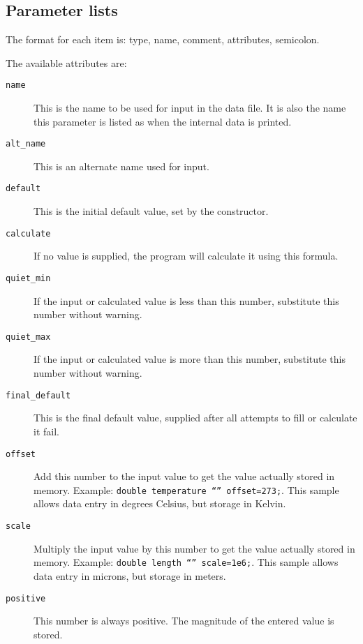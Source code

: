 \subsection{Parameter lists}

The format for each item is: type, name, comment, attributes, semicolon.

The available attributes are:

\begin{description}

\item[{\tt name}]
This is the name to be used for input in the data file.  It is also
the name this parameter is listed as when the internal data is
printed.

\item[{\tt alt\_name}]
This is an alternate name used for input.

\item[{\tt default}]
This is the initial default value, set by the constructor.

\item[{\tt calculate}]
If no value is supplied, the program will calculate it using this
formula.

\item[{\tt quiet\_min}]
If the input or calculated value is less than this number, substitute
this number without warning.

\item[{\tt quiet\_max}]
If the input or calculated value is more than this number, substitute
this number without warning.

\item[{\tt final\_default}]
This is the final default value, supplied after all attempts to fill
or calculate it fail.

\item[{\tt offset}]
Add this number to the input value to get the value actually stored in
memory.  Example: {\tt double temperature ``'' offset=273;}.  This
sample allows data entry in degrees Celsius, but storage in Kelvin.

\item[{\tt scale}]
Multiply the input value by this number to get the value actually
stored in memory.  Example: {\tt double length ``'' scale=1e6;}.
This sample allows data entry in microns, but storage in meters.

\item[{\tt positive}]
This number is always positive.  The magnitude of the entered value is
stored.


\end{description}
